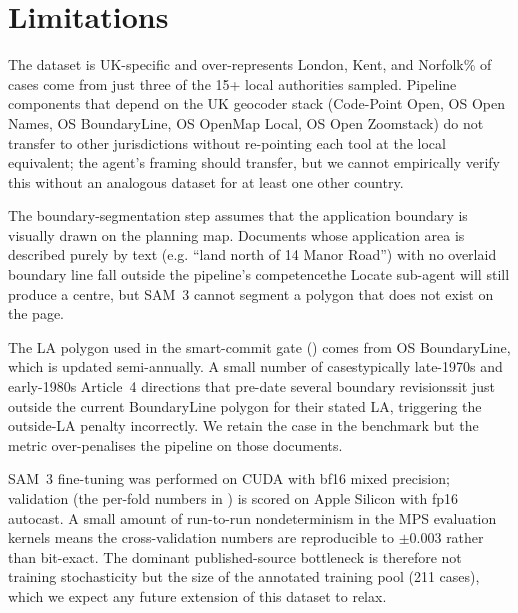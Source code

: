 \documentclass[11pt]{article}
\begin{document}
\newpage

\section*{Limitations}

The dataset is UK-specific and over-represents London, Kent, and Norfolk\% of cases come from just three of the 15+ local authorities sampled. Pipeline components that depend on the UK geocoder stack (Code-Point Open, OS Open Names, OS BoundaryLine, OS OpenMap Local, OS Open Zoomstack) do not transfer to other jurisdictions without re-pointing each tool at the local equivalent; the agent's framing should transfer, but we cannot empirically verify this without an analogous dataset for at least one other country.

The boundary-segmentation step assumes that the application boundary is visually drawn on the planning map. Documents whose application area is described purely by text (e.g. ``land north of 14 Manor Road'') with no overlaid boundary line fall outside the pipeline's competence\textemdash the Locate sub-agent will still produce a centre, but SAM~3 cannot segment a polygon that does not exist on the page.

The LA polygon used in the smart-commit gate () comes from OS BoundaryLine, which is updated semi-annually. A small number of cases\textemdash typically late-1970s and early-1980s Article~4 directions that pre-date several boundary revisions\textemdash sit just outside the current BoundaryLine polygon for their stated LA, triggering the outside-LA penalty incorrectly. We retain the case in the benchmark but the metric over-penalises the pipeline on those documents.

SAM~3 fine-tuning was performed on CUDA with bf16 mixed precision; validation (the per-fold numbers in ) is scored on Apple Silicon with fp16 autocast. A small amount of run-to-run nondeterminism in the MPS evaluation kernels means the cross-validation numbers are reproducible to $\pm 0.003$ rather than bit-exact. The dominant published-source bottleneck is therefore not training stochasticity but the size of the annotated training pool (211 cases), which we expect any future extension of this dataset to relax.

\end{document}
